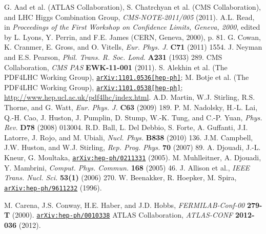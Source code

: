 \documentclass[12pt, letterpaper]{report}
\begin{document}
\begin{thebibliography}{99}

 G. Aad et al. (ATLAS Collaboration), S. Chatrchyan et al. (CMS Collaboration), and LHC Higgs Combination Group, \textit{CMS-NOTE-2011/005} (2011).
 A.L. Read, in \textit{Proceedings of the First Workshop on Confidence Limits, Geneva, 2000}, edited by L. Lyons, Y. Perrin, and F.E. James (CERN, Geneva, 2000), p. 81.
 G. Cowan, K. Cranmer, E. Gross, and O. Vitells, \textit{Eur. Phys. J.} \textbf{C71} (2011) 1554.
 J. Neyman and E.S. Pearson, \textit{Phil. Trans. R. Soc. Lond.} \textbf{A231} (1933) 289.
 CMS Collaboration, \textit{CMS PAS} \textbf{EWK-11-001} (2011).
 S. Alekhin et al. (The PDF4LHC Working Group), \href{http://arxiv.org/abs/1101.0536}{\texttt{arXiv:1101.0536[hep-ph]}}; M. Botje et al. (The PDF4LHC Working Group), \href{http://arxiv.org/abs/1101.0538}{\texttt{arXiv:1101.0538[hep-ph]}}; \url{http://www.hep.ucl.ac.uk/pdf4lhc/index.html}.
 A.D. Martin, W.J. Stirling, R.S. Thorne, and G. Watt, \textit{Eur. Phys. J.} \textbf{C63} (2009) 189.
 P. M. Nadolsky, H.-L. Lai, Q.-H. Cao, J. Huston, J. Pumplin, D. Stump, W.-K. Tung, and C.-P. Yuan, \textit{Phys. Rev.} \textbf{D78} (2008) 013004.
 R.D. Ball, L. Del Debbio, S. Forte, A. Guffanti, J.I. Latorre, J. Rojo, and M. Ubiali, \textit{Nucl. Phys.} \textbf{B838} (2010) 136.
 J.M. Campbell, J.W. Huston, and W.J. Stirling, \textit{Rep. Prog. Phys.} \textbf{70} (2007) 89.
 A. Djouadi, J.-L. Kneur, G. Moultaka, \href{http://arxiv.org/abs/hep-ph/0211331}{\texttt{arXiv:hep-ph/0211331}} (2005).
 M. Muhlleitner, A. Djouadi, Y. Mambrini, \textit{Comput. Phys. Commun.} \textbf{168} (2005) 46.
 J. Allison et al., \textit{IEEE Trans. Nucl. Sci.} \textbf{53(1)} (2006) 270.
 W. Beenakker, R. Hoepker, M. Spira, \href{http://arxiv.org/abs/hep-ph/9611232}{\texttt{arXiv:hep-ph/9611232}} (1996).


 M. Carena, J.S. Conway, H.E. Haber, and J.D. Hobbs, \textit{FERMILAB-Conf-00} \textbf{279-T} (2000).  \href{http://arxiv.org/abs/hep-ph/0010338}{\texttt{arXiv:hep-ph/0010338}}
 ATLAS Collaboration, \textit{ATLAS-CONF} \textbf{2012-036} (2012).



\end{thebibliography}
\end{document}
